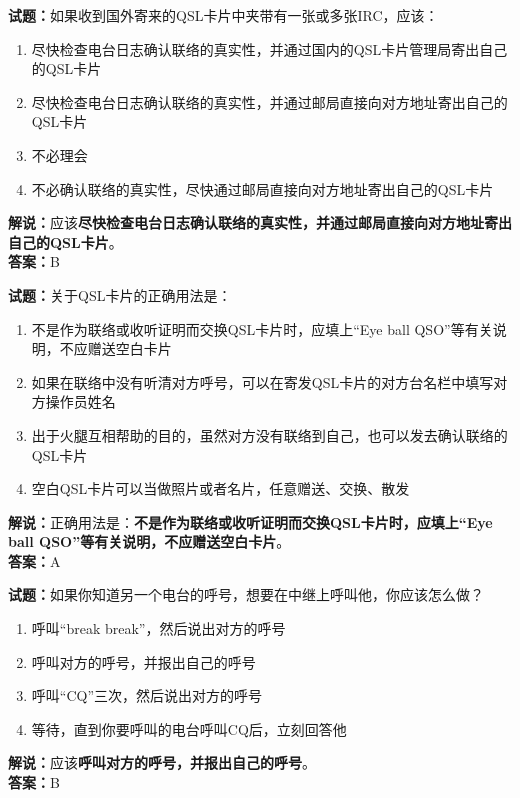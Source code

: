 \documentclass{ctexbook}
\begin{document}
\noindent\textbf{试题：}如果收到国外寄来的QSL卡片中夹带有一张或多张IRC，应该：
\begin{enumerate}[leftmargin=3em]
\item 尽快检查电台日志确认联络的真实性，并通过国内的QSL卡片管理局寄出自己的QSL卡片
\item 尽快检查电台日志确认联络的真实性，并通过邮局直接向对方地址寄出自己的QSL卡片
\item 不必理会
\item 不必确认联络的真实性，尽快通过邮局直接向对方地址寄出自己的QSL卡片
\end{enumerate}
\noindent\textbf{解说：}应该\textbf{尽快检查电台日志确认联络的真实性，并通过邮局直接向对方地址寄出自己的QSL卡片}。\\\noindent\textbf{答案：}B




\bigskip


\noindent\textbf{试题：}关于QSL卡片的正确用法是：
\begin{enumerate}[leftmargin=3em]
\item 不是作为联络或收听证明而交换QSL卡片时，应填上“Eye ball QSO”等有关说明，不应赠送空白卡片
\item 如果在联络中没有听清对方呼号，可以在寄发QSL卡片的对方台名栏中填写对方操作员姓名
\item 出于火腿互相帮助的目的，虽然对方没有联络到自己，也可以发去确认联络的QSL卡片
\item 空白QSL卡片可以当做照片或者名片，任意赠送、交换、散发
\end{enumerate}
\noindent\textbf{解说：}正确用法是：\textbf{不是作为联络或收听证明而交换QSL卡片时，应填上“Eye ball QSO”等有关说明，不应赠送空白卡片}。\\\noindent\textbf{答案：}A

\bigskip


\noindent\textbf{试题：}如果你知道另一个电台的呼号，想要在中继上呼叫他，你应该怎么做？
\begin{enumerate}[leftmargin=3em]
\item 呼叫“break break”，然后说出对方的呼号
\item 呼叫对方的呼号，并报出自己的呼号
\item 呼叫“CQ”三次，然后说出对方的呼号
\item 等待，直到你要呼叫的电台呼叫CQ后，立刻回答他
\end{enumerate}
\noindent\textbf{解说：}应该\textbf{呼叫对方的呼号，并报出自己的呼号}。\\\noindent\textbf{答案：}B
\end{document}
